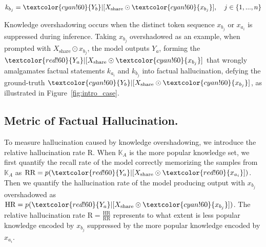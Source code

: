 \vspace{-0.5em}
\begin{small}
\begin{equation}
    k_{b_j} = \textcolor{cyan!60}{Y_b} | [X_{\mathrm{share}} \odot \textcolor{cyan!60}{x_{b_j}}], \quad j \in \{1, ..., n\}
\end{equation}
\end{small}



\vspace{-0.5em}\noindent Knowledge overshadowing occurs when the distinct token sequence $x_{b_j}$ or $x_{a_i}$ is suppressed during inference. Taking $x_{b_j}$ overshadowed as an example, when prompted with $X_\mathrm{share}\odot x_{b_j}$, the model outputs $Y_a$, forming the $\textcolor{red!60}{Y_a} | [X_{\mathrm{share}} \odot \textcolor{cyan!60}{x_{b_j}}]$ that wrongly amalgamates factual statements $k_{a_i}$ and $k_{b_j}$ into factual hallucination, defying the ground-truth $\textcolor{cyan!60}{Y_b} | [X_{\mathrm{share}} \odot \textcolor{cyan!60}{x_{b_j}}]$, as illustrated in Figure~\ref{fig:intro_case}.



\subsection{Metric of Factual Hallucination.}
To measure hallucination caused by knowledge overshadowing, we introduce the relative hallucination rate $\text{R}$.
When $\mathbb{K}_A$ is the more popular knowledge set, we first quantify the recall rate of the model correctly memorizing the samples from 
$\mathbb{K}_A$ as $\text{RR}=p(\textcolor{red!60}{Y_a} | [X_{\mathrm{share}} \odot \textcolor{red!60}{x_{a_i}}])$. 
Then we quantify the hallucination rate of the model producing output with $x_{b_j}$ overshadowed as $\text{HR}=p(\textcolor{red!60}{Y_a} | [X_{\mathrm{share}} \odot \textcolor{cyan!60}{x_{b_j}}])$.                  The relative hallucination rate $\text{R}=\frac{\text{HR}} {\text{RR}}$ represents to what extent is less popular knowledge encoded by $x_{b_j}$ suppressed by the more popular knowledge encoded by $x_{a_i}$.


